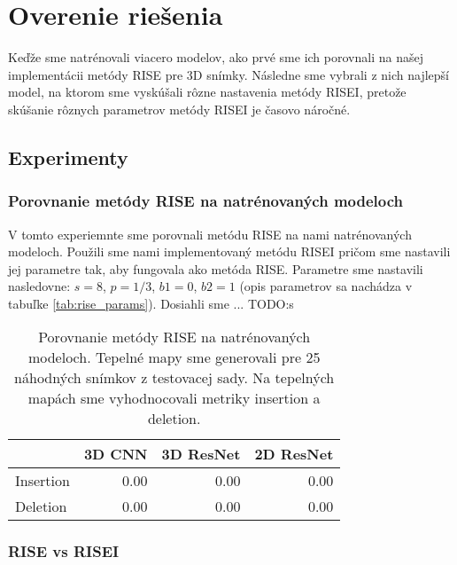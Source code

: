 \chapter{Overenie riešenia}

Keďže sme natrénovali viacero modelov, ako prvé sme ich porovnali na našej implementácii metódy RISE pre 3D snímky.
Následne sme vybrali z nich najlepší model, na ktorom sme vyskúšali rôzne nastavenia metódy RISEI, pretože skúšanie rôznych parametrov metódy RISEI je časovo náročné.

\section{Experimenty}

\subsection{Porovnanie metódy RISE na natrénovaných modeloch}

V tomto experiemnte sme porovnali metódu RISE na nami natrénovaných modeloch. Použili sme nami implementovaný metódu RISEI pričom sme nastavili jej parametre tak, aby fungovala ako metóda RISE.
Parametre sme nastavili nasledovne: $s = 8$, $p = 1/3$, $b1 = 0$, $b2 = 1$ (opis parametrov sa nachádza v tabuľke \ref{tab:rise_params}). Dosiahli sme ... TODO:s

\begin{table}[]
    \centering
    \begin{tabular}{l|r|r|r|}
        \cline{2-4}
                                        & \multicolumn{1}{c|}{3D CNN} & \multicolumn{1}{c|}{3D ResNet} & \multicolumn{1}{c|}{2D ResNet} \\ \hline
        \multicolumn{1}{|l|}{Insertion} & 0.00                        & 0.00                           & 0.00                           \\
        \multicolumn{1}{|l|}{Deletion}  & 0.00                        & 0.00                           & 0.00                           \\ \hline
    \end{tabular}
    \caption{Porovnanie metódy RISE na natrénovaných modeloch. Tepelné mapy sme generovali pre 25 náhodných snímkov z testovacej sady. Na tepelných mapách sme vyhodnocovali metriky insertion a deletion.}
    \label{tab:model_training_results}
\end{table}

\subsection{RISE vs RISEI}

